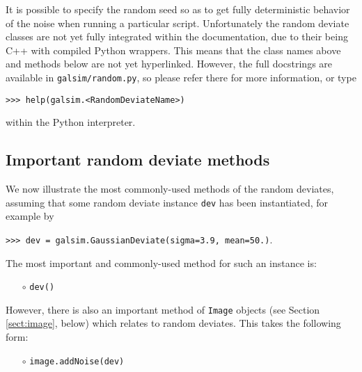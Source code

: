\documentclass[preprint,11pt]{aastex}
\begin{document}
It is possible to specify the random seed so as to get fully
deterministic behavior of the noise when running a particular script.
Unfortunately the random deviate classes are not yet fully integrated
within the documentation, due to their being C++ with compiled Python
wrappers.  This means that the class names above and methods below are
not yet hyperlinked.  However, the full docstrings are available in
\texttt{galsim/random.py}, so please refer there for more information,
or type

{\tt >>> help(galsim.<RandomDeviateName>)}

within the Python interpreter.

\subsection{Important random deviate methods}\label{sect:randommethods}
We now illustrate the most commonly-used methods of the random
deviates, assuming that some random deviate instance \texttt{dev} has
been instantiated, for example by

{\tt >>> dev = galsim.GaussianDeviate(sigma=3.9, mean=50.)}.

The most important and commonly-used method for such an
instance is:
\begin{itemize}

\item[$\circ$] \texttt{dev()} 

\end{itemize}
However, there is also an important method of \texttt{Image} objects
(see Section \ref{sect:image}, below) which relates to random
deviates.  This takes the following form:

\begin{itemize}

\item[$\circ$] \texttt{image.addNoise(dev)} 

\end{itemize}
\end{document}
